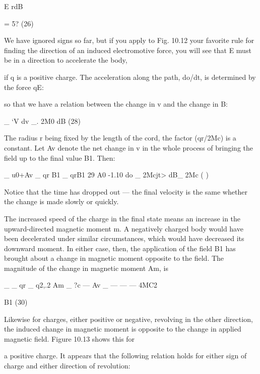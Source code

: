 {E rdB

= 5? (26)

We have ignored signs so far, but if you apply to Fig. 10.12 your
favorite rule for finding the direction of an induced electromotive
force, you will see that E must be in a direction to accelerate the body,

if q is a positive charge. The acceleration along the path, do/dt, is
determined by the force qE:

so that we have a relation between the change in v and the change
in B:
\begin{equation}
\end{equation}

_ ‘V
dv _. 2M0 dB (28)

The radius r being fixed by the length of the cord, the factor (qr/2Mc)
is a constant. Let Av denote the net change in v in the whole process
of bringing the field up to the final value B1. Then:
\begin{equation}
\end{equation}

_ u0+Av _ qr B1 _ qrB1 29
A0 -1.10 do _ 2Mcjt> dB_ 2Mc ( )

Notice that the time has dropped out --- the final velocity is the same
whether the change is made slowly or quickly.

The increased speed of the charge in the final state means an increase
in the upward-directed magnetic moment m. A negatively
charged body would have been decelerated under similar 
circumstances, which would have decreased its downward moment. In
either case, then, the application of the field B1 has brought about
a change in magnetic moment opposite to the field. The magnitude
of the change in magnetic moment Am, is
\begin{equation}
\end{equation}

_ _ qr _ q2,.2
Am _ ?c --- Av _  ---  ---  --- 4MC2

B1 (30)

Likewise for charges, either positive or negative, revolving in the
other direction, the induced change in magnetic moment is opposite
to the change in applied magnetic field. Figure 10.13 shows this for

 

a positive charge. It appears that the following relation holds for
either sign of charge and either direction of revolution:
\begin{equation}
\end{equation}

}
